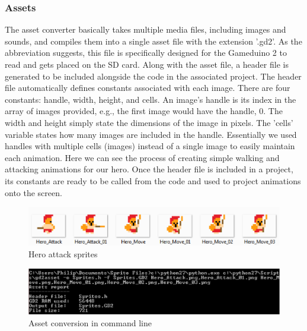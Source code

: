 \subsubsection*{Assets}
The asset converter basically takes multiple media files, including images and sounds, and compiles them into a single asset file with the extension '.gd2'. As the abbreviation suggests, this file is specifically designed for the Gameduino 2 to read and gets placed on the SD card. Along with the asset file, a header file is generated to be included alongside the code in the associated project. The header file automatically defines constants associated with each image. There are four constants: handle, width, height, and cells. An image’s handle is its index in the array of images provided, e.g., the first image would have the handle, 0. The width and height simply state the dimensions of the image in pixels. The 'cells' variable states how many images are included in the handle. Essentially we used handles with multiple cells (images) instead of a single image to easily maintain each animation. Here we can see the process of creating simple walking and attacking animations for our hero. Once the header file is included in a project, its constants are ready to be called from the code and used to project animations onto the screen.


\begin{figure}[h]
  \centering
  \includegraphics[scale=1]{Figures/HeroAttack}
  \caption{Hero attack sprites}
  \label{fig:Hero_Attak}
\end{figure}

\begin{figure}[h]
  \centering
  \includegraphics[scale=0.95]{Figures/Asset_cmd}
  \caption{Asset conversion in command line}
  \label{fig:asset_cmd}
\end{figure}


